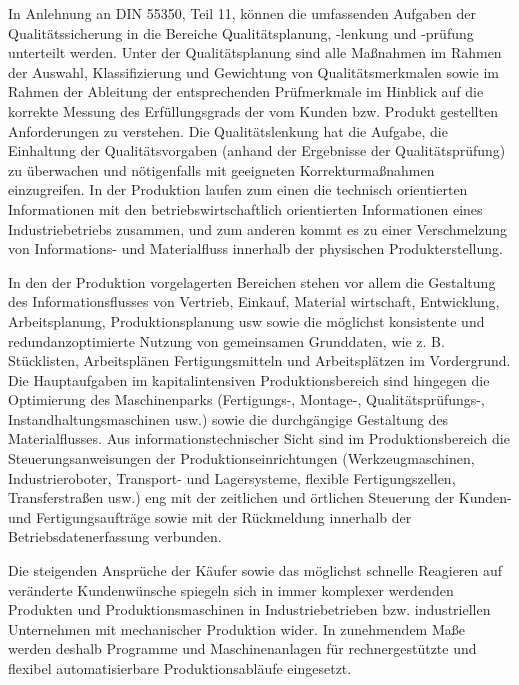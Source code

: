 In Anlehnung an DIN 55350, Teil 11, können die umfassenden Aufgaben der Qualitätssicherung in die Bereiche Qualitätsplanung, -lenkung und -prüfung unterteilt werden. Unter der Qualitätsplanung sind alle Maßnahmen im Rahmen der Auswahl, Klassifizierung und Gewichtung von Qualitätsmerkmalen sowie im Rahmen der Ableitung der entsprechenden Prüfmerkmale im Hinblick auf die korrekte Messung des Erfüllungsgrads der vom Kunden bzw. Produkt gestellten Anforderungen zu verstehen. Die Qualitätslenkung hat die Aufgabe, die Einhaltung der Qualitätsvorgaben (anhand der Ergebnisse der Qualitätsprüfung) zu überwachen und nötigenfalls mit geeigneten Korrekturmaßnahmen einzugreifen.
In der Produktion laufen zum einen die technisch orientierten Informationen mit den betriebswirtschaftlich orientierten Informationen eines Industriebetriebs zusammen, und zum anderen kommt es zu einer Verschmelzung von Informations- und Materialfluss innerhalb der physischen Produkterstellung.

In den der Produktion vorgelagerten Bereichen stehen vor allem die Gestaltung des Informationsflusses von Vertrieb, Einkauf, Material wirtschaft, Entwicklung, Arbeitsplanung, Produktionsplanung usw sowie die möglichst konsistente und redundanzoptimierte Nutzung von gemeinsamen Grunddaten, wie z. B. Stücklisten, Arbeitsplänen Fertigungsmitteln und Arbeitsplätzen im Vordergrund. Die Hauptaufgaben im kapitalintensiven Produktionsbereich sind hingegen die Optimierung des Maschinenparks (Fertigungs-, Montage-, Qualitätsprüfungs-, Instandhaltungsmaschinen usw.) sowie die durchgängige Gestaltung des Materialflusses. Aus informationstechnischer Sicht sind im Produktionsbereich die Steuerungsanweisungen der Produktionseinrichtungen (Werkzeugmaschinen, Industrieroboter, Transport- und Lagersysteme, flexible Fertigungszellen, Transferstraßen usw.) eng mit der zeitlichen und örtlichen Steuerung der Kunden- und Fertigungsaufträge sowie mit der Rückmeldung innerhalb der Betriebsdatenerfassung verbunden.




Die steigenden Ansprüche der Käufer sowie das möglichst schnelle Reagieren auf veränderte Kundenwünsche spiegeln sich in immer komplexer werdenden Produkten und Produktionsmaschinen in Industriebetrieben bzw. industriellen Unternehmen mit mechanischer Produktion wider. In zunehmendem Maße werden deshalb Programme und Maschinenanlagen für rechnergestützte und flexibel automatisierbare Produktionsabläufe eingesetzt. 




